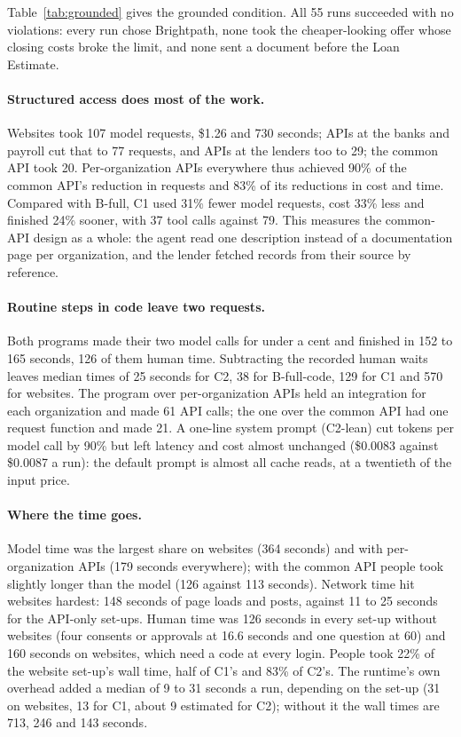 \documentclass[11pt]{article}
\begin{document}
Table~\ref{tab:grounded} gives the grounded condition. All 55 runs succeeded with no violations: every run chose Brightpath, none took the cheaper-looking offer whose closing costs broke the limit, and none sent a document before the Loan Estimate.

\paragraph{Structured access does most of the work.} Websites took 107 model requests, \$1.26 and 730 seconds; APIs at the banks and payroll cut that to 77 requests, and APIs at the lenders too to 29; the common API took 20. Per-organization APIs everywhere thus achieved 90\% of the common API's reduction in requests and 83\% of its reductions in cost and time. Compared with B-full, C1 used 31\% fewer model requests, cost 33\% less and finished 24\% sooner, with 37 tool calls against 79. This measures the common-API design as a whole: the agent read one description instead of a documentation page per organization, and the lender fetched records from their source by reference.

\paragraph{Routine steps in code leave two requests.} Both programs made their two model calls for under a cent and finished in 152 to 165 seconds, 126 of them human time. Subtracting the recorded human waits leaves median times of 25 seconds for C2, 38 for B-full-code, 129 for C1 and 570 for websites. The program over per-organization APIs held an integration for each organization and made 61 API calls; the one over the common API had one request function and made 21. A one-line system prompt (C2-lean) cut tokens per model call by 90\% but left latency and cost almost unchanged (\$0.0083 against \$0.0087 a run): the default prompt is almost all cache reads, at a twentieth of the input price.

\paragraph{Where the time goes.} Model time was the largest share on websites (364 seconds) and with per-organization APIs (179 seconds everywhere); with the common API people took slightly longer than the model (126 against 113 seconds). Network time hit websites hardest: 148 seconds of page loads and posts, against 11 to 25 seconds for the API-only set-ups. Human time was 126 seconds in every set-up without websites (four consents or approvals at 16.6 seconds and one question at 60) and 160 seconds on websites, which need a code at every login. People took 22\% of the website set-up's wall time, half of C1's and 83\% of C2's. The runtime's own overhead added a median of 9 to 31 seconds a run, depending on the set-up (31 on websites, 13 for C1, about 9 estimated for C2); without it the wall times are 713, 246 and 143 seconds.
\end{document}

